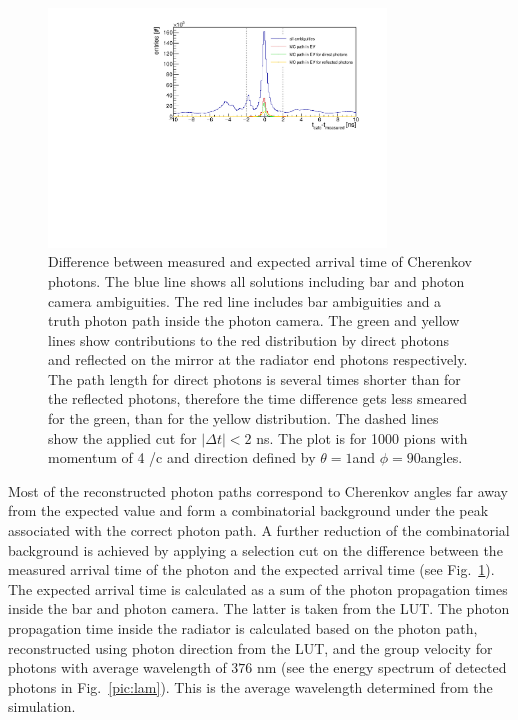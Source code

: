 \begin{figure}[!h]
\centering
\includegraphics[width=0.8\textwidth]{pics/hDiff.pdf}
\caption{\label{pic:dtime}
Difference between measured and expected arrival time of Cherenkov photons. The blue line shows all solutions including bar and photon camera ambiguities. The red line includes bar ambiguities and a truth photon path inside the photon camera. The green and yellow lines show contributions to the red distribution by direct photons and reflected on the mirror at the radiator end photons respectively. The path length for direct photons is several times shorter than for the reflected photons, therefore the time difference gets less smeared for the green, than for the yellow distribution. The dashed lines show the applied cut for $|\Delta t| < 2$ ns. The plot is for 1000 pions with momentum of 4 \gev/c and direction defined by $\theta = 1$\mydeg and $\phi = 90$\mydeg angles.
}
\end{figure}

Most of the reconstructed photon paths correspond to Cherenkov angles far away from the expected value and form a combinatorial background under the peak associated with the correct photon path. A further reduction of the combinatorial background is achieved by applying a selection cut on the difference between the measured arrival time of the photon and the expected arrival time (see Fig.~\ref{pic:dtime}). The expected arrival time is calculated as a sum of the photon propagation times inside the bar and photon camera. The latter is taken from the LUT. The photon propagation time inside the radiator is calculated based on the photon path, reconstructed using photon direction from the LUT, and the group velocity for photons with average wavelength of $376$ nm (see the energy spectrum of detected photons in Fig.~\ref{pic:lam}). This is the average wavelength determined from the simulation.

